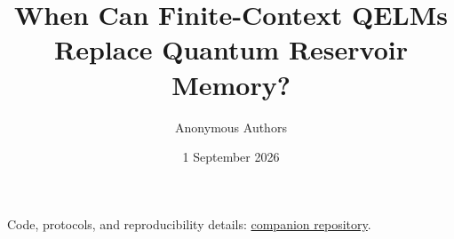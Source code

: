 \documentclass[aps,pra,reprint,superscriptaddress,nofootinbib,longbibliography,floatfix]{revtex4-2}
\begin{document}
\title{When Can Finite-Context QELMs Replace Quantum Reservoir Memory?}
\author{Anonymous Authors}
\noaffiliation
\date{1 September 2026}

\begin{abstract}

\end{abstract}

\maketitle






\FloatBarrier






\noindent Code, protocols, and reproducibility details:
\href{https://github.com/eybmits/qrc_vs_qelm}{companion repository}.
\end{document}
